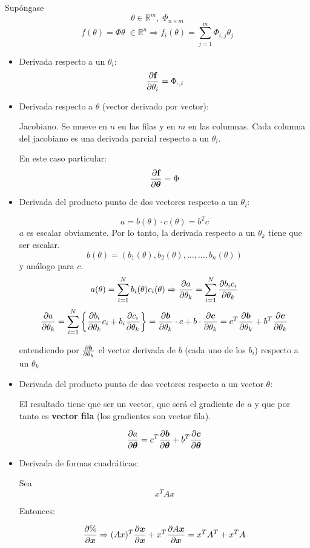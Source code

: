 \documentclass{article}
\begin{document}
Supóngase 
$$\theta \in \mathbb{R}^{m}, \; \Phi_{n\times m}$$
$$f(\theta) = \Phi \theta \; \in \mathbb{R}^n \Rightarrow f_i(\theta) = \sum_{j = 1}^{m}\Phi_{i,j}\theta_j$$
\begin{itemize}
\item Derivada respecto a un $\theta_i$:
$$\frac{\partial\textbf{f}}{\partial\theta_i} = \Phi_{:,i}$$
\item Derivada respecto a $\theta$ (vector derivado por vector):

Jacobiano. Se mueve en $n$ en las filas y en $m$ en las columnas. Cada columna del jacobiano es una derivada parcial respecto a un $\theta_i$.

En este caso particular:
$$\frac{\partial\textbf{f}}{\partial\boldsymbol{\theta}} = \Phi$$
\item Derivada del producto punto de dos vectores respecto a un $\theta_i$:

$$a = b(\theta)\cdot c(\theta) = b^Tc$$
$a$ es escalar obviamente. Por lo tanto, la derivada respecto a un $\theta_k$ tiene que ser escalar.
$$b(\theta) = (b_1(\theta),b_2(\theta),\ldots,...,b_n(\theta))$$ y análogo para $c$.
$$a(\theta) = \sum_{i = 1}^{N}b_i(\theta)c_i(\theta) \Rightarrow \frac{\partial a}{\partial\theta_k} = \sum_{i = 1}^{N}\frac{\partial{b_i}{c_i}}{\partial\theta_k}$$
$$\frac{\partial a}{\partial\theta_k} = \sum_{i = 1}^{N} \left\lbrace \frac{\partial b_i}{\partial\theta_k}c_i+b_i\frac{\partial c_i}{\partial\theta_k} \right\rbrace = \frac{\partial\boldsymbol{b}}{\partial\theta_k}\cdot c+b\cdot \frac{\partial\boldsymbol{c}}{\partial\theta_k} = c^T\frac{\partial\boldsymbol{b}}{\partial\theta_k}+b^T\frac{\partial\boldsymbol{c}}{\partial\theta_k}$$

entendiendo por $\frac{\partial\boldsymbol{b}}{\partial\theta_k}$ el vector derivada de $b$ (cada uno de los $b_i$) respecto a un $\theta_k$

\item Derivada del producto punto de dos vectores respecto a un vector $\theta$:

El resultado tiene que ser un vector, que será el gradiente de $a$ y que por tanto es \textbf{vector fila} (los gradientes son vector fila).

$$\frac{\partial a}{\partial\boldsymbol{\theta}} = c^T\frac{\partial\boldsymbol{b}}{\partial\boldsymbol{\theta}}+b^T\frac{\partial\boldsymbol{c}}{\partial\boldsymbol{\theta}}$$

\item Derivada de formas cuadráticas:

Sea
$$x^TAx$$

Entonces:

$$\frac{\partial\%}{\partial\boldsymbol{x}} \Rightarrow (Ax)^T\frac{\partial\boldsymbol{x}}{\partial\boldsymbol{x}}+ x^T\frac{\partial A\boldsymbol{x}}{\partial\boldsymbol{x}} = x^TA^T+x^TA$$
\end{itemize}
\end{document}

